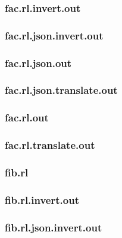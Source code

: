 \subsubsection{fac.rl.invert.out}
\label{app:fac_rl.invert.out}

\subsubsection{fac.rl.json.invert.out}
\label{app:fac_rl.json.invert.out}

\subsubsection{fac.rl.json.out}
\label{app:fac_rl.json.out}

\subsubsection{fac.rl.json.translate.out}
\label{app:fac_rl.json.translate.out}

\subsubsection{fac.rl.out}
\label{app:fac_rl.out}

\subsubsection{fac.rl.translate.out}
\label{app:fac_rl.translate.out}

\subsubsection{fib.rl}
\label{app:fib_rl}

\subsubsection{fib.rl.invert.out}
\label{app:fib_rl.invert.out}

\subsubsection{fib.rl.json.invert.out}
\label{app:fib_rl.json.invert.out}

